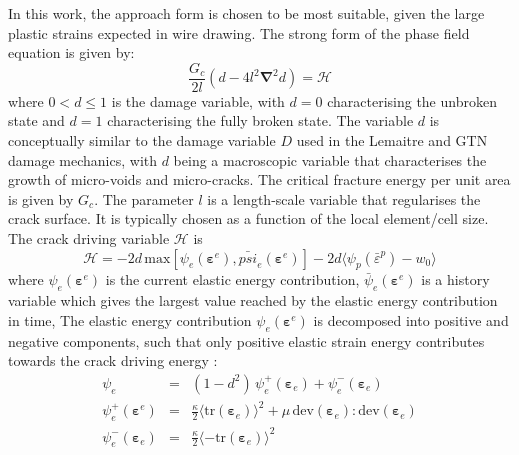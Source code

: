 \documentclass[sn-mathphys,Numbered,draft]{sn-jnl}%
\newcommand{\bb}{\boldsymbol}
\begin{document}
In this work, the approach form \citet{borden_phase-field_2016} is chosen to be most suitable, given the large plastic strains expected in wire drawing.
The strong form of the phase field equation is given by:
\begin{equation} \label{eqn:phaseFieldEquation}
	\frac{G_c}{2l} \left(d - 4 l^2 \bb{\nabla}^2 d \right) = \mathcal{H} %
\end{equation}
where $0 < d \leq 1$ is the damage variable, with $d = 0$ characterising the unbroken state and $d = 1$ characterising the fully broken state. 
The variable $d$ is conceptually similar to the damage variable $D$ used in the Lemaitre and GTN damage mechanics, with $d$ being a macroscopic variable that characterises the growth of micro-voids and micro-cracks.
The critical fracture energy per unit area is given by $G_c$.
The parameter $l$ is a length-scale variable that regularises the crack surface. It is typically chosen as a function of the local element/cell size.
The crack driving variable $\mathcal{H}$ is
\begin{equation}
	\mathcal{H} %
	=
		-2d \,
		\text{max}
		\left[
			\psi_e
			\left(\bb{\varepsilon}^e\right),
			\bar{psi}_{e}\left(\bb{\varepsilon}^e\right)
		\right]
	-2d
	\langle \psi_p({\bar{\varepsilon}}^p)-w_0 \rangle
\end{equation}
where $\psi_e \left(\mathbf{\varepsilon}^e\right)$ is the current elastic energy contribution, $\bar{\psi}_e \left(\mathbf{\varepsilon}^e\right)$ is a history variable which gives the largest value reached by the elastic energy contribution in time, 
The elastic energy contribution $\psi_e \left(\mathbf{\varepsilon}^e\right)$ is decomposed into positive and negative components, such that only positive elastic strain energy contributes towards the crack driving energy \citep{amor_regularized_2009}:
\begin{eqnarray}
	\psi_e &=&
	(1 - d^2) \, \psi_{e}^{+} \left(\bb{\varepsilon}_e \right)
	+ \psi_{e}^{-} \left(\bb{\varepsilon}_e \right) \\
	\psi_e^{+}\left(\bb{\varepsilon}^{e}\right) &=&
	\frac{\kappa}{2} \langle \text{tr}\left(\bb{\varepsilon}_{e}\right)\rangle^2
	+\mu \,\text{dev}(\bb{\varepsilon}_e): \text{dev}(\bb{\varepsilon}_e) \\
    	\psi_e^{-} \left(\bb{\varepsilon}_{e}\right) &=&
	\frac{\kappa}{2} \langle-\text{tr}\left(\bb{\varepsilon}_{e}\right) \rangle^2
\end{eqnarray}
\end{document}
